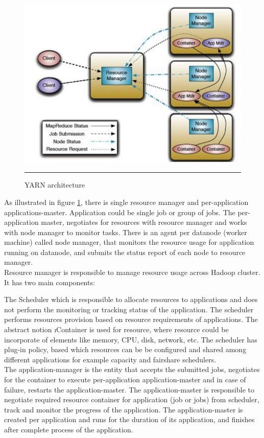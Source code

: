 \begin{figure}[htbp]
  \centering
    \includegraphics[width=10 cm,height=10 cm]{./Figures/yarn.pdf}
    \rule{25em}{0.5pt}
  \caption{YARN‌ architecture \cite{yarn}}
  \label{yarn}
\end{figure}

As illustrated in figure \ref{yarn}, there is single resource manager and per-application applications-master. Application could be single job or group of jobs. The per-application master, negotiates for resources with resource manager and works with node manager to monitor tasks. There is an agent per datanode (worker machine) called node manager, that  monitors the resource usage for application running on datanode, and submits the status report of each node to resource manager.\\
 
Resource manager is responsible to manage resource usage across Hadoop cluster. It has two main components:

The Scheduler which is responsible to allocate resources to applications and does not perform the monitoring or tracking status of the application. The scheduler performs resources provision based on resource requirements of applications. The abstract notion \i{Container} is used for resource, where resource could be incorporate of elements like memory, CPU, disk, network, etc. The scheduler has plug-in policy, based which resources can be be configured and shared among different applications for example capacity and fairshare schedulers.\\

The application-manager is the entity that accepts the submitted jobs, negotiates for the container to execute per-application application-master and in case of failure, restarts the application-master. The application-master is responsible to negotiate required resource container for application (job or jobs) from scheduler, track and monitor the progress of the application. The application-master is created per application and runs for the duration of its application, and finishes after complete process of the application.\\  


